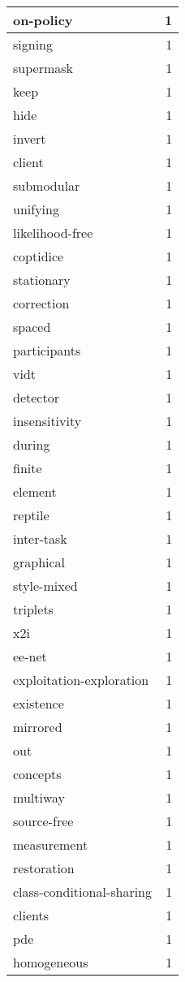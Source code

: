 \begin{table}[h]
\begin{tabular}{|l|r|}
\hline
on-policy & 1 \\
\hline
signing & 1 \\
\hline
supermask & 1 \\
\hline
keep & 1 \\
\hline
hide & 1 \\
\hline
invert & 1 \\
\hline
client & 1 \\
\hline
submodular & 1 \\
\hline
unifying & 1 \\
\hline
likelihood-free & 1 \\
\hline
coptidice & 1 \\
\hline
stationary & 1 \\
\hline
correction & 1 \\
\hline
spaced & 1 \\
\hline
participants & 1 \\
\hline
vidt & 1 \\
\hline
detector & 1 \\
\hline
insensitivity & 1 \\
\hline
during & 1 \\
\hline
finite & 1 \\
\hline
element & 1 \\
\hline
reptile & 1 \\
\hline
inter-task & 1 \\
\hline
graphical & 1 \\
\hline
style-mixed & 1 \\
\hline
triplets & 1 \\
\hline
x2i & 1 \\
\hline
ee-net & 1 \\
\hline
exploitation-exploration & 1 \\
\hline
existence & 1 \\
\hline
mirrored & 1 \\
\hline
out & 1 \\
\hline
concepts & 1 \\
\hline
multiway & 1 \\
\hline
source-free & 1 \\
\hline
measurement & 1 \\
\hline
restoration & 1 \\
\hline
class-conditional-sharing & 1 \\
\hline
clients & 1 \\
\hline
pde & 1 \\
\hline
homogeneous & 1 \\

\end{tabular}
\end{table}
